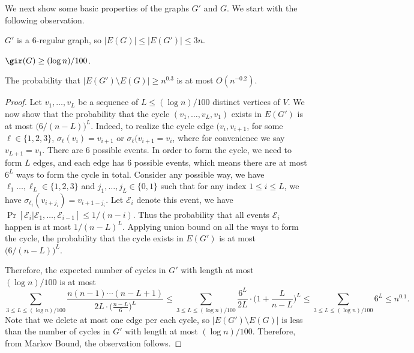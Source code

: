 
We next show some basic properties of the graphs $G'$ and $G$. We start with the following observation.

\begin{observation}
$G'$ is a $6$-regular graph, so $|E(G)|\le |E(G')|\le 3n$.
\end{observation}

\begin{observation}
\label{obs: girth}
$\gir(G)\ge (\log n)/100$.
\end{observation}

\begin{observation}
The probability that $|E(G')\setminus E(G)|\ge n^{0.3}$ is at most $O(n^{-0.2})$.
\end{observation}
\begin{proof}
    Let $v_1,\ldots,v_L$ be a sequence of $L\le (\log n)/100$ distinct vertices of $V$. We now show that the probability that the cycle $(v_1,\ldots,v_L,v_1)$ exists in $E(G')$ is at most $\big(6/(n-L)\big)^{L}$. Indeed, to realize the cycle edge $(v_i,v_{i+1}$, for some $\ell \in \{1,2,3\}$, $\sigma_{\ell}(v_i)=v_{i+1}$ or $\sigma_{\ell}(v_{i+1}=v_i$, where for convenience we say $v_{L+1} = v_1$. There are $6$ possible events. In order to form the cycle, we need to form $L$ edges, and each edge has $6$ possible events, which means there are at most $6^L$ ways to form the cycle in total. Consider any possible way, we have $\ell_1 \dots, \ell_{L} \in \{1,2,3\}$ and $j_1, \dots, j_L \in \{0,1\}$ such that for any index $1 \le i \le L$, we have $\sigma_{\ell_i}(v_{i+j_i})=v_{i+1-j_i}$. Let $\mathcal{E}_i$ denote this event, we have $\Pr[\mathcal{E}_i | \mathcal{E}_1 , \dots, \mathcal{E}_{i-1}] \le 1/(n-i)$. Thus the probability that all events $\mathcal{E}_i$ happen is at most $1/(n-L)^L$. Applying union bound on all the ways to form the cycle, the probability that the cycle exists in $E(G')$ is at most $\big(6/(n-L)\big)^L$.


Therefore, the expected number of cycles in $G'$ with length at most $(\log n)/100$ is at most 
\[\sum_{3\le L\le (\log n)/100} \frac{n(n-1)\cdots (n-L+1)}{2L\cdot \big(\frac{n-L}{6}\big)^{L}}\le \sum_{3\le L\le (\log n)/100} \frac{6^L}{2L}\cdot \bigg(1+\frac{L}{n-L}\bigg)^{L}\le \sum_{3\le L\le (\log n)/100} 6^L\le n^{0.1}. \]
Note that we delete at most one edge per each cycle, so $|E(G')\setminus E(G)|$ is less than the number of cycles in $G'$ with length at most $(\log n)/100$. Therefore, from Markov Bound, the observation follows.
\end{proof}


